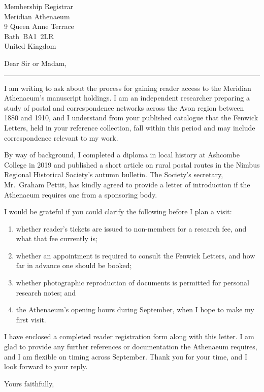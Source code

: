 \documentclass[
  paper=a4,
  fontsize=11pt,
  DIV=11,
  parskip=half,
  fromalign=right,
  fromphone=true,
  fromemail=true,
  fromlogo=true,
  addrfield=true,
  backaddress=false,
  foldmarks=false,
  footsepline=false,
  headsepline=false,
  version=last
]{scrlttr2}
\newcommand{\divider}{%
  \par\vspace{2pt}%
  \noindent\textcolor{fog}{\rule{\linewidth}{0.4pt}}%
  \par\vspace{7pt}%
}
\begin{document}
\begin{letter}{Membership Registrar\\Meridian Athenaeum\\9 Queen Anne Terrace\\Bath~BA1~2LR\\United Kingdom}


\opening{Dear Sir or Madam,}

\divider

I am writing to ask about the process for gaining reader access to the Meridian Athenaeum's manuscript holdings. I am an independent researcher preparing a study of postal and correspondence networks across the Avon region between 1880 and 1910, and I understand from your published catalogue that the Fenwick Letters, held in your reference collection, fall within this period and may include correspondence relevant to my work.

By way of background, I completed a diploma in local history at Ashcombe College in 2019 and published a short article on rural postal routes in the Nimbus Regional Historical Society's autumn bulletin. The Society's secretary, Mr.\ Graham Pettit, has kindly agreed to provide a letter of introduction if the Athenaeum requires one from a sponsoring body.

I would be grateful if you could clarify the following before I plan a visit:

\begin{enumerate}[label=(\alph*), leftmargin=1.6em, itemsep=3pt, topsep=4pt]
  \item whether reader's tickets are issued to non-members for a research fee, and what that fee currently is;
  \item whether an appointment is required to consult the Fenwick Letters, and how far in advance one should be booked;
  \item whether photographic reproduction of documents is permitted for personal research notes; and
  \item the Athenaeum's opening hours during September, when I hope to make my first visit.
\end{enumerate}

I have enclosed a completed reader registration form along with this letter. I am glad to provide any further references or documentation the Athenaeum requires, and I am flexible on timing across September. Thank you for your time, and I look forward to your reply.

\closing{Yours faithfully,}


\end{letter}
\end{document}
